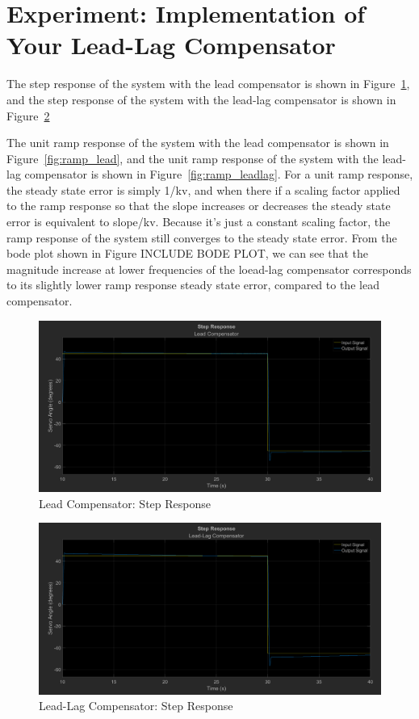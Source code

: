 \documentclass[12pt]{article}
\begin{document}
\clearpage

\section{Experiment: Implementation of Your Lead-Lag Compensator}

The step response of the system with the lead compensator is shown in Figure~\ref{fig:step_lead}, and the step response of the system with the lead-lag compensator is shown in Figure~\ref{fig:step_leadlag}

The unit ramp response of the system with the lead compensator is shown in Figure~\ref{fig:ramp_lead}, and the unit ramp response of the system with the lead-lag compensator is shown in Figure~\ref{fig:ramp_leadlag}. For a unit ramp response, the steady state error is simply 1/kv, and when there if a scaling factor applied to the ramp response so that the slope increases or decreases the steady state error is equivalent to slope/kv. Because it's just a constant scaling factor, the ramp response of the system still converges to the steady state error. From the bode plot shown in Figure INCLUDE BODE PLOT, we can see that the magnitude increase at lower frequencies of the loead-lag compensator corresponds to its slightly lower ramp response steady state error, compared to the lead compensator.

\begin{figure}[h!]
	\centering
    \includegraphics[width=\textwidth]{step_lead}
    \caption{\label{fig:step_lead}Lead Compensator: Step Response}
\end{figure}

\begin{figure}[h!]
    \centering
    \includegraphics[width=\textwidth]{step_leadlag}
    \caption{\label{fig:step_leadlag}Lead-Lag Compensator: Step Response}
\end{figure}
\end{document}
